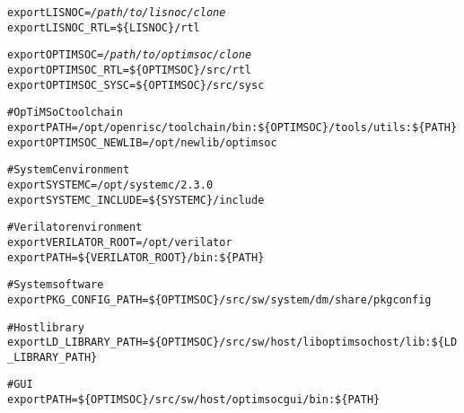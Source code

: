 \begin{alltt}
export LISNOC=\emph{/path/to/lisnoc/clone}
export LISNOC_RTL=\$\{LISNOC\}/rtl

export OPTIMSOC=\emph{/path/to/optimsoc/clone}
export OPTIMSOC_RTL=\$\{OPTIMSOC\}/src/rtl
export OPTIMSOC_SYSC=\$\{OPTIMSOC\}/src/sysc

# OpTiMSoC toolchain
export PATH=/opt/openrisc/toolchain/bin:\$\{OPTIMSOC\}/tools/utils:\$\{PATH\}
export OPTIMSOC_NEWLIB=/opt/newlib/optimsoc

# SystemC environment
export SYSTEMC=/opt/systemc/2.3.0
export SYSTEMC_INCLUDE=\$\{SYSTEMC\}/include

# Verilator environment
export VERILATOR\_ROOT=/opt/verilator
export PATH=\$\{VERILATOR_ROOT\}/bin:\$\{PATH\}

# System software
export PKG_CONFIG_PATH=\$\{OPTIMSOC\}/src/sw/system/dm/share/pkgconfig

# Host library
export LD_LIBRARY_PATH=\$\{OPTIMSOC\}/src/sw/host/liboptimsochost/lib:\$\{LD_LIBRARY_PATH\}

# GUI
export PATH=\$\{OPTIMSOC\}/src/sw/host/optimsocgui/bin:\$\{PATH\}


\end{alltt}